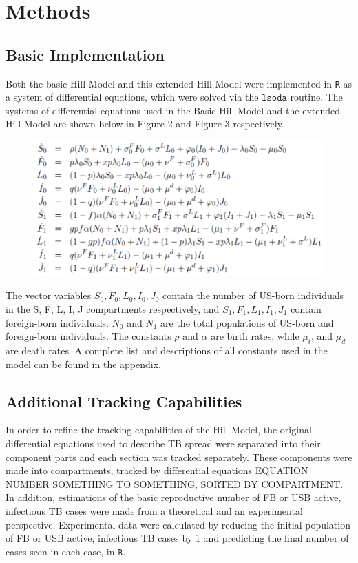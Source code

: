 \documentclass{amsart}
\begin{document}
\section{Methods}

\subsection{Basic Implementation}
Both the basic Hill Model and this extended Hill Model were implemented in
\texttt{R} as a system of differential equations, which were solved via the
$\texttt{lsoda}$ routine. The systems of differential equations used in the Basic
Hill Model and the extended Hill Model are shown below in Figure 2 and Figure 3
respectively.   

\begin{figure}
\includegraphics[scale=0.75]{figures/BasicHillEquations.pdf}
\end{figure}

The vector variables $S_{0}, F_{0}, L_{0}, I_{0}, J_{0}$ contain the number of US-born individuals in the S, F, L, I, J compartments respectively, and $S_{1}, F_{1}, L_{1}, I_{1}, J_{1}$ contain foreign-born individuals.  $N_{0}$ and $N_{1}$ are the total populations of US-born and foreign-born individuals.
The constants $\rho$ and $\alpha$ are birth rates, while $\mu_{i}$, and $\mu_{d}$ are death rates.  
A complete list and descriptions of all constants used in the model can be found in the appendix.

\subsection{Additional Tracking Capabilities}
In order to refine the tracking capabilities of the
Hill Model, the original differential equations used to describe TB spread were
separated into their component parts and each section was tracked separately.
These components were made into compartments, tracked by differential equations
EQUATION NUMBER SOMETHING TO SOMETHING, SORTED BY COMPARTMENT. In addition,
estimations of the basic reproductive number of FB or USB active, infectious TB
cases were made from a theoretical and an experimental perspective. Experimental
data were calculated by reducing the initial population of FB or USB active,
infectious TB cases by 1 and predicting the final number of cases seen in each
case, in $\texttt{R}$. 
\end{document}
